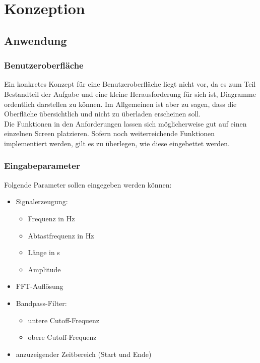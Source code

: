 \documentclass[a4paper]{article}
\begin{document}
\section{Konzeption}\label{sec:konzeption}

\subsection{Anwendung}\label{subsec:anwendung}

\subsubsection{Benutzeroberfläche}

Ein konkretes Konzept für eine Benutzeroberfläche liegt nicht vor, da es zum Teil Bestandteil der Aufgabe und eine kleine Herausforderung für sich ist, Diagramme ordentlich darstellen zu können. Im Allgemeinen ist aber zu sagen, dass die Oberfläche übersichtlich und nicht zu überladen erscheinen soll.\\
Die Funktionen in den Anforderungen lassen sich möglicherweise gut auf einen einzelnen Screen platzieren. Sofern noch weiterreichende Funktionen implementiert werden, gilt es zu überlegen, wie diese eingebettet werden.

\subsubsection{Eingabeparameter}

Folgende Parameter sollen eingegeben werden können:
\begin{itemize}
  \item Signalerzeugung:
  \begin{itemize}
    \item Frequenz in Hz
    \item Abtastfrequenz in Hz
    \item Länge in s
    \item Amplitude
  \end{itemize}
  \item FFT-Auflösung
  \item Bandpass-Filter:
  \begin{itemize}
    \item untere Cutoff-Frequenz
    \item obere Cutoff-Frequenz
  \end{itemize}
  \item anzuzeigender Zeitbereich (Start und Ende)
\end{itemize}
\end{document}
